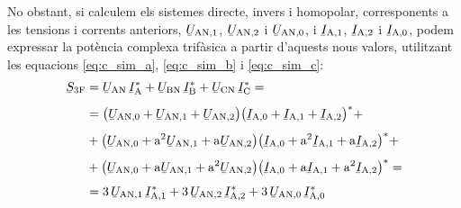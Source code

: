 No obstant, si calculem els sistemes directe, invers i homopolar,
corresponents a les tensions i corrents anteriors,
$\cmplx{U}\ped{AN,1}$, $\cmplx{U}\ped{AN,2}$ i
$\cmplx{U}\ped{AN,0}$, i $\cmplx{I}\ped{A,1}$,
$\cmplx{I}\ped{A,2}$ i $\cmplx{I}\ped{A,0}$, podem
expressar la pot\`{e}ncia complexa trif\`{a}sica a partir d'aquests nous
valors, utilitzant les equacions \eqref{eq:c_sim_a},
\eqref{eq:c_sim_b} i \eqref{eq:c_sim_c}:
\begin{equation}
\begin{split}
   \cmplx{S}\ped{3F} &= \cmplx{U}\ped{AN} \,\cmplx{I}\ped{A}^* +
   \cmplx{U}\ped{BN} \,\cmplx{I}\ped{B}^* +  \cmplx{U}\ped{CN} \,\cmplx{I}\ped{C}^* = \\[1ex]
   &= \big(\cmplx{U}\ped{AN,0} + \cmplx{U}\ped{AN,1} +
   \cmplx{U}\ped{AN,2}\big) \big(\cmplx{I}\ped{A,0} + \cmplx{I}\ped{A,1} +
   \cmplx{I}\ped{A,2}\big)^* +  \\[1ex]
   &+ \big(\cmplx{U}\ped{AN,0} + \au^2 \cmplx{U}\ped{AN,1} +
   \au \cmplx{U}\ped{AN,2} \big) \big(\cmplx{I}\ped{A,0} + \au^2 \cmplx{I}\ped{A,1}
    + \au \cmplx{I}\ped{A,2} \big)^* + \\[1ex]
   &+ \big(\cmplx{U}\ped{AN,0} + \au \cmplx{U}\ped{AN,1} + \au^2
   \cmplx{U}\ped{AN,2} \big) \big(\cmplx{I}\ped{A,0} + \au
   \cmplx{I}\ped{A,1} + \au^2 \cmplx{I}\ped{A,2} \big)^* =  \\[1ex]
   &= 3\, \cmplx{U}\ped{AN,1} \, \cmplx{I}\ped{A,1}^* +
   3\, \cmplx{U}\ped{AN,2}\,  \cmplx{I}\ped{A,2}^* +
   3\, \cmplx{U}\ped{AN,0} \, \cmplx{I}\ped{A,0}^* \label{eq:c_sim_s}
\end{split}
\end{equation}

